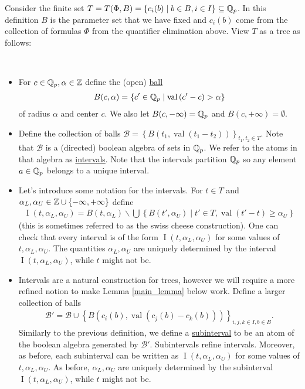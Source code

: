 \documentclass{amsart}
\newcommand{\BB}{\mathscr B}
\newcommand{\curly}[1]{\left\{#1\right\}}
\newcommand{\paren}[1]{\left(#1\right)}
\DeclareMathOperator{\vval}{val}
\DeclareMathOperator{\inti}{I}
\newcommand{\defn}{\ul}
\newcommand{\interval}{\inti(t, \alpha_L, \alpha_U)}
\begin{document}
Consider the finite set $T = T(\Phi, B) = \curly{c_i(b) \mid b \in B, i \in I} \subseteq \Q_p$.
In this definition $B$ is the parameter set that we have fixed 
and $c_i(b)$ come from the collection of formulas $\Phi$ from the quantifier elimination above.
View $T$ as a tree as follows:
\begin{Definition} \ 
  \begin{itemize}
  \item For $c \in \mathbb{Q}_p, \alpha \in \mathbb{Z}$  define the (open) \defn{ball} 
    \begin{align*}
      B(c, \alpha) = \curly{c' \in \Q_p \mid \vval \paren{c' - c} > \alpha}
    \end{align*}
    of radius $\alpha$ and center $c$.
    We also let $B(c, -\infty) = \mathbb{Q}_p$ and $B(c, +\infty) = \emptyset$.
  \item Define the collection of balls $\BB = \curly{B(t_1, \vval(t_1 - t_2))}_{t_1, t_2 \in T}$.
    Note that $\BB$ is a (directed) boolean algebra of sets in $\mathbb{Q}_p$.
    We refer to the atoms in that algebra as \defn{intervals}.
    Note that the intervals partition $\mathbb{Q}_p$ so any element $a \in \mathbb{Q}_p$ belongs to a unique interval.
  \item Let's introduce some notation for the intervals.
    For $t \in T$ and $\alpha_L, \alpha_U \in \Z \cup \curly{-\infty, +\infty}$ define
    \begin{align*}
      \interval = B(t, \alpha_L) \backslash \bigcup \curly{B(t', \alpha_U) \mid t' \in T, \vval(t' - t) \geq \alpha_U}
    \end{align*}
    (this is sometimes referred to as the swiss cheese construction).
    One can check that every interval is of the form $\interval$ for some values of $t, \alpha_L, \alpha_U$.
    The quantities $\alpha_L, \alpha_U$ are uniquely determined by the interval $\interval$,
    while $t$ might not be.
  \item Intervals are a natural construction for trees, however we will require a more refined notion to make Lemma \ref{main_lemma} below work.
    Define a larger collection of balls 
    \begin{align*}
      \BB' = \BB \cup \curly{B(c_i(b), \vval(c_j(b) - c_k(b)))}_{i,j,k \in I, b \in B}.  
    \end{align*}
    Similarly to the previous definition, we define a \defn{subinterval} to be an atom of the boolean algebra generated by $\BB'$.
    Subintervals refine intervals.
    Moreover, as before, each subinterval can be written as $\interval$ for some values of $t, \alpha_L, \alpha_U$.
    As before, $\alpha_L, \alpha_U$ are uniquely determined by the subinterval $\interval$,
    while $t$ might not be.
  \end{itemize}
\end{Definition}
\end{document}
